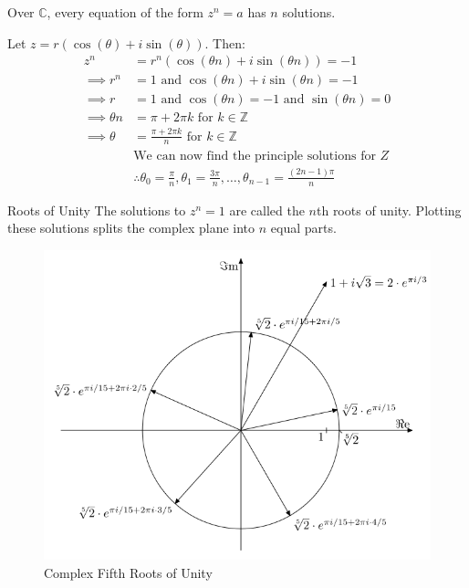 \begin{remark}
    Over $\mathbb{C}$, every equation of the form $z^n = a$ has $n$ solutions.
\end{remark}
\begin{example}
    [Solving $z^n = -1$]
    Let $z = r(\cos(\theta) + i\sin(\theta))$. Then:
    \begin{align*}
        z^n               & = r^n(\cos(\theta n) + i\sin(\theta n)) = -1                                                               \\
        \implies r^n      & = 1 \text{ and } \cos(\theta n) + i\sin(\theta n) = -1                                                     \\
        \implies r        & = 1 \text{ and } \cos(\theta n) = -1 \text{ and } \sin(\theta n) = 0                                       \\
        \implies \theta n & = \pi + 2\pi k \text{ for } k \in \mathbb{Z}                                                               \\
        \implies \theta   & = \frac{\pi + 2\pi k}{n} \text{ for } k \in \mathbb{Z}                                                     \\
                          & \text{We can now find the principle solutions for } Z                                                      \\
                          & \therefore \theta_0 = \frac{\pi}{n}, \theta_1 = \frac{3\pi}{n}, \ldots, \theta_{n-1} = \frac{(2n-1)\pi}{n}
    \end{align*}
\end{example}
\begin{remark}
    Roots of Unity
    The solutions to $z^n = 1$ are called the $n$th roots of unity. Plotting these solutions splits the complex plane into $n$ equal parts.
    \begin{figure}
        \centering
        \includegraphics[scale = 0.2]{./LECTURE_1/Complex_fifth_roots.png}
        \caption{Complex Fifth Roots of Unity}
        \label{fig:roots}
    \end{figure}
\end{remark}
